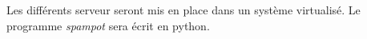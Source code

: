 
Les différents serveur seront mis en place dans un système virtualisé.
Le programme \emph{spampot} sera écrit en python. 
